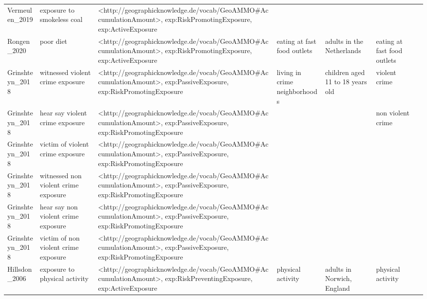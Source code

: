 \begin{tabular}{p{1cm}p{1cm}p{1cm}p{1cm}p{1cm}p{1cm}p{1cm}}
Vermeulen\_2019 & exposure to smokeless coal & <http://geographicknowledge.de/vocab/GeoAMMO\#AccumulationAmount>, exp:RiskPromotingExposure, exp:ActiveExposure &  &  &  &  \\
Rongen\_2020 & poor diet & <http://geographicknowledge.de/vocab/GeoAMMO\#AccumulationAmount>, exp:RiskPromotingExposure, exp:ActiveExposure & eating at fast food outlets & adults in the Netherlands & eating at fast food outlets &  \\
Grinshteyn\_2018 & witnessed violent crime exposure & <http://geographicknowledge.de/vocab/GeoAMMO\#AccumulationAmount>, exp:PassiveExposure, exp:RiskPromotingExposure & living in crime neighborhoods & children aged 11 to 18 years old & violent crime &  \\
Grinshteyn\_2018 & hear say violent crime exposure & <http://geographicknowledge.de/vocab/GeoAMMO\#AccumulationAmount>, exp:PassiveExposure, exp:RiskPromotingExposure &  &  & non violent crime &  \\
Grinshteyn\_2018 & victim of violent crime exposure & <http://geographicknowledge.de/vocab/GeoAMMO\#AccumulationAmount>, exp:PassiveExposure, exp:RiskPromotingExposure &  &  &  &  \\
Grinshteyn\_2018 & witnessed non violent crime exposure & <http://geographicknowledge.de/vocab/GeoAMMO\#AccumulationAmount>, exp:PassiveExposure, exp:RiskPromotingExposure &  &  &  &  \\
Grinshteyn\_2018 & hear say non violent crime exposure & <http://geographicknowledge.de/vocab/GeoAMMO\#AccumulationAmount>, exp:PassiveExposure, exp:RiskPromotingExposure &  &  &  &  \\
Grinshteyn\_2018 & victim of non violent crime exposure & <http://geographicknowledge.de/vocab/GeoAMMO\#AccumulationAmount>, exp:PassiveExposure, exp:RiskPromotingExposure &  &  &  &  \\
Hillsdon\_2006 & exposure to physical activity & <http://geographicknowledge.de/vocab/GeoAMMO\#AccumulationAmount>, exp:RiskPreventingExposure, exp:ActiveExposure & physical activity & adults in Norwich, England & physical activity &  \\
\bottomrule
\end{tabular}
